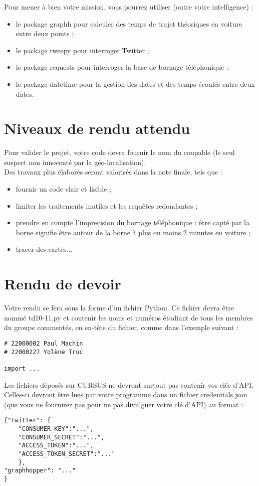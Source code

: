 \documentclass[11pt,a4paper]{article}
\begin{document}
Pour mener à bien votre mission, vous pourrez utiliser (outre votre intelligence) :
\begin{itemize}
\item le package graphh pour calculer des temps de trajet théoriques en voiture entre deux points ;
\item le package tweepy pour interroger Twitter ;
\item le package requests pour interroger la base de bornage téléphonique : \url{}
\item le package datetime pour la gestion des dates et des temps écoulés entre deux dates.
\end{itemize}


\section{Niveaux de rendu attendu}

Pour valider le projet, votre code devra fournir le nom du coupable (le seul suspect non innocenté par la géo-localisation).
\\

Des travaux plus élaborés seront valorisés dans la note finale, tels que : 
\begin{itemize}
    \item fournir un code clair et lisible ;
    \item limiter les traitements inutiles et les requêtes redondantes ;
    \item prendre en compte l'imprecision du bornage téléphonique : être capté par la borne signifie être autour de la borne à plus ou moins 2 minutes en voiture ;
    \item tracer des cartes...
\end{itemize}


\section{Rendu de devoir}
Votre rendu se fera sous la forme d’un
fichier Python. Ce fichier devra être nommé td10-11.py et contenir les noms et numéros étudiant de tous
les membres du groupe commentés, en en-tête du fichier, comme dans l’exemple suivant :
\begin{verbatim}
# 22000002 Paul Machin
# 22000227 Yolène Truc

import ...
\end{verbatim}
Les fichiers déposés sur CURSUS ne devront surtout pas contenir vos clés d’API. Celles-ci devront être lues par votre programme dans un fichier credentials.json (que vous ne fournirez pas pour ne pas divulguer votre clé d’API) au format :
\begin{verbatim}
{"twitter": {
    "CONSUMER_KEY":"...",
    "CONSUMER_SECRET":"...",
    "ACCESS_TOKEN":"...",
    "ACCESS_TOKEN_SECRET":"..."
    },
"graphhopper": "..."
}
\end{verbatim}
\end{document}
